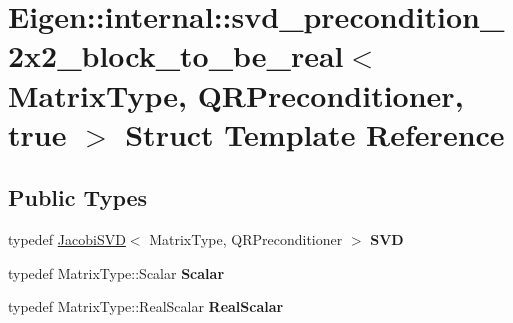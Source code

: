 \hypertarget{struct_eigen_1_1internal_1_1svd__precondition__2x2__block__to__be__real_3_01_matrix_type_00_01_qb58fa819a3391e7d55d98ccdc14db9e4}{}\section{Eigen\+::internal\+::svd\+\_\+precondition\+\_\+2x2\+\_\+block\+\_\+to\+\_\+be\+\_\+real$<$ Matrix\+Type, Q\+R\+Preconditioner, true $>$ Struct Template Reference}
\label{struct_eigen_1_1internal_1_1svd__precondition__2x2__block__to__be__real_3_01_matrix_type_00_01_qb58fa819a3391e7d55d98ccdc14db9e4}
\subsection*{Public Types}
\begin{DoxyCompactItemize}
\item 
\mbox{\label{struct_eigen_1_1internal_1_1svd__precondition__2x2__block__to__be__real_3_01_matrix_type_00_01_qb58fa819a3391e7d55d98ccdc14db9e4_a6eb249bbad69fe226879d1e64e1c01c6}} 
typedef \mbox{\hyperlink{class_eigen_1_1_jacobi_s_v_d}{Jacobi\+S\+VD}}$<$ Matrix\+Type, Q\+R\+Preconditioner $>$ {\bfseries S\+VD}
\item 
\mbox{\label{struct_eigen_1_1internal_1_1svd__precondition__2x2__block__to__be__real_3_01_matrix_type_00_01_qb58fa819a3391e7d55d98ccdc14db9e4_ada4e70275b77aaeb1af07b5141b773e1}} 
typedef Matrix\+Type\+::\+Scalar {\bfseries Scalar}
\item 
\mbox{\label{struct_eigen_1_1internal_1_1svd__precondition__2x2__block__to__be__real_3_01_matrix_type_00_01_qb58fa819a3391e7d55d98ccdc14db9e4_a5a0e30c2f4c8f54c4940144c8bd3db0e}} 
typedef Matrix\+Type\+::\+Real\+Scalar {\bfseries Real\+Scalar}
\end{DoxyCompactItemize}
